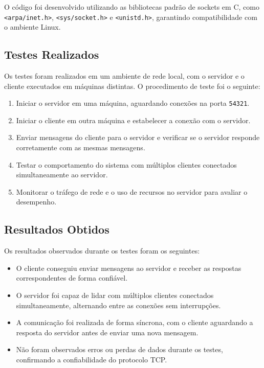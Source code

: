 O código foi desenvolvido utilizando as bibliotecas padrão de sockets em C, como \texttt{<arpa/inet.h>}, \texttt{<sys/socket.h>} e \texttt{<unistd.h>}, garantindo compatibilidade com o ambiente Linux.

\subsection*{Testes Realizados}

Os testes foram realizados em um ambiente de rede local, com o servidor e o cliente executados em máquinas distintas. O procedimento de teste foi o seguinte:
\begin{enumerate}
    \item Iniciar o servidor em uma máquina, aguardando conexões na porta \texttt{54321}.
    \item Iniciar o cliente em outra máquina e estabelecer a conexão com o servidor.
    \item Enviar mensagens do cliente para o servidor e verificar se o servidor responde corretamente com as mesmas mensagens.
    \item Testar o comportamento do sistema com múltiplos clientes conectados simultaneamente ao servidor.
    \item Monitorar o tráfego de rede e o uso de recursos no servidor para avaliar o desempenho.
\end{enumerate}

\subsection*{Resultados Obtidos}

Os resultados observados durante os testes foram os seguintes:
\begin{itemize}
    \item O cliente conseguiu enviar mensagens ao servidor e receber as respostas correspondentes de forma confiável.
    \item O servidor foi capaz de lidar com múltiplos clientes conectados simultaneamente, alternando entre as conexões sem interrupções.
    \item A comunicação foi realizada de forma síncrona, com o cliente aguardando a resposta do servidor antes de enviar uma nova mensagem.
    \item Não foram observados erros ou perdas de dados durante os testes, confirmando a confiabilidade do protocolo TCP.
\end{itemize}

